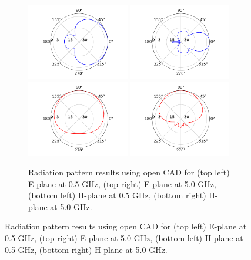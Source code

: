 \documentclass[11pt]{amsart}
\begin{document}
\begin{figure}[ht]
\centering
\begin{subfigure}{0.65\textwidth}
    \includegraphics[width=0.49\textwidth]{figures/3DHorn_CAD_0_5GHz_E_plane.png}
	\includegraphics[width=0.49\textwidth]{figures/3DHorn_CAD_5GHz_E_plane.png} \\
	\includegraphics[width=0.49\textwidth]{figures/3DHorn_CAD_0_5GHz_H_plane.png}
	\includegraphics[width=0.49\textwidth]{figures/3DHorn_CAD_5GHz_H_plane.png}
    \caption{Radiation pattern results using open CAD for (top left) E-plane at 0.5 GHz, (top right) E-plane at 5.0 GHz, (bottom left) H-plane at 0.5 GHz, (bottom right) H-plane at 5.0 GHz.}

\end{subfigure}
\end{figure}
\end{document}
